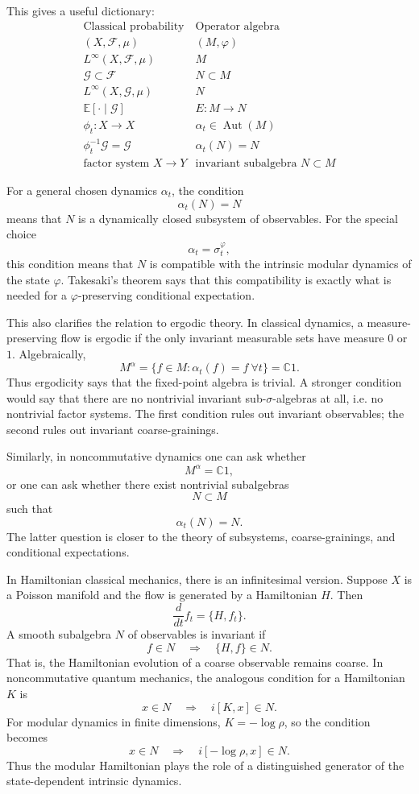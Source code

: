 \documentclass[a4paper,11pt]{article}
\theoremstyle{definition}
\begin{document}
This gives a useful dictionary:
\[
\begin{array}{c|c}
\text{Classical probability} & \text{Operator algebra} \\
\hline
(X,\mathcal F,\mu) & (M,\varphi) \\
L^\infty(X,\mathcal F,\mu) & M \\
\mathcal G\subset\mathcal F & N\subset M \\
L^\infty(X,\mathcal G,\mu) & N \\
\mathbb E[\cdot\mid \mathcal G] & E:M\to N \\
\phi_t:X\to X & \alpha_t\in\operatorname{Aut}(M) \\
\phi_t^{-1}\mathcal G=\mathcal G & \alpha_t(N)=N \\
\text{factor system }X\to Y & \text{invariant subalgebra }N\subset M
\end{array}
\]

For a general chosen dynamics \(\alpha_t\), the condition
\[
\alpha_t(N)=N
\]
means that \(N\) is a dynamically closed subsystem of observables. For the special choice
\[
\alpha_t=\sigma_t^\varphi,
\]
this condition means that \(N\) is compatible with the intrinsic modular dynamics of the state \(\varphi\). Takesaki's theorem says that this compatibility is exactly what is needed for a \(\varphi\)-preserving conditional expectation.

This also clarifies the relation to ergodic theory. In classical dynamics, a measure-preserving flow is ergodic if the only invariant measurable sets have measure \(0\) or \(1\). Algebraically,
\[
M^\alpha
=
\{f\in M:\alpha_t(f)=f\ \forall t\}
=
\mathbb C1.
\]
Thus ergodicity says that the fixed-point algebra is trivial. A stronger condition would say that there are no nontrivial invariant sub-\(\sigma\)-algebras at all, i.e. no nontrivial factor systems. The first condition rules out invariant observables; the second rules out invariant coarse-grainings.

Similarly, in noncommutative dynamics one can ask whether
\[
M^\alpha=\mathbb C1,
\]
or one can ask whether there exist nontrivial subalgebras
\[
N\subset M
\]
such that
\[
\alpha_t(N)=N.
\]
The latter question is closer to the theory of subsystems, coarse-grainings, and conditional expectations.

In Hamiltonian classical mechanics, there is an infinitesimal version. Suppose \(X\) is a Poisson manifold and the flow is generated by a Hamiltonian \(H\). Then
\[
\frac{d}{dt}f_t=\{H,f_t\}.
\]
A smooth subalgebra \(N\) of observables is invariant if
\[
f\in N
\quad\Longrightarrow\quad
\{H,f\}\in N.
\]
That is, the Hamiltonian evolution of a coarse observable remains coarse. In noncommutative quantum mechanics, the analogous condition for a Hamiltonian \(K\) is
\[
x\in N
\quad\Longrightarrow\quad
i[K,x]\in N.
\]
For modular dynamics in finite dimensions, \(K=-\log\rho\), so the condition becomes
\[
x\in N
\quad\Longrightarrow\quad
i[-\log\rho,x]\in N.
\]
Thus the modular Hamiltonian plays the role of a distinguished generator of the state-dependent intrinsic dynamics.
\end{document}

